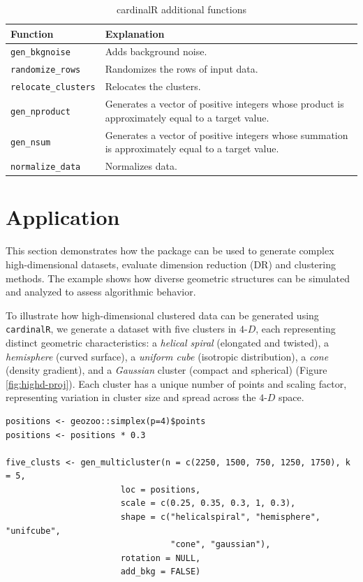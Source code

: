 \begin{table}

\caption{\label{tab:add-tb-pdf}cardinalR additional functions}
\centering
\begin{tabular}[t]{>{\raggedright\arraybackslash}p{4cm}>{\raggedright\arraybackslash}p{8cm}}
\toprule
Function & Explanation\\
\midrule
\texttt{gen\_bkgnoise} & Adds background noise.\\
\texttt{randomize\_rows} & Randomizes the rows of input data.\\
\texttt{relocate\_clusters} & Relocates the clusters.\\
\texttt{gen\_nproduct} & Generates a vector of positive integers whose product is approximately equal to a target value.\\
\texttt{gen\_nsum} & Generates a vector of positive integers whose summation is approximately equal to a target value.\\
\texttt{normalize\_data} & Normalizes data.\\
\bottomrule
\end{tabular}
\end{table}

\section{Application}\label{application}

This section demonstrates how the package can be used to generate complex high-dimensional datasets, evaluate dimension reduction (DR) and clustering methods. The example shows how diverse geometric structures can be simulated and analyzed to assess algorithmic behavior.

To illustrate how high-dimensional clustered data can be generated using \texttt{cardinalR}, we generate a dataset with five clusters in \(4\text{-}D\), each representing distinct geometric characteristics: a \emph{helical spiral} (elongated and twisted), a \emph{hemisphere} (curved surface), a \emph{uniform cube} (isotropic distribution), a \emph{cone} (density gradient), and a \emph{Gaussian} cluster (compact and spherical) (Figure \ref{fig:highd-proj}). Each cluster has a unique number of points and scaling factor, representing variation in cluster size and spread across the \(4\text{-}D\) space.

\begin{verbatim}
positions <- geozoo::simplex(p=4)$points
positions <- positions * 0.3

five_clusts <- gen_multicluster(n = c(2250, 1500, 750, 1250, 1750), k = 5,
                       loc = positions,
                       scale = c(0.25, 0.35, 0.3, 1, 0.3),
                       shape = c("helicalspiral", "hemisphere", "unifcube", 
                                 "cone", "gaussian"),
                       rotation = NULL,
                       add_bkg = FALSE)
\end{verbatim}


